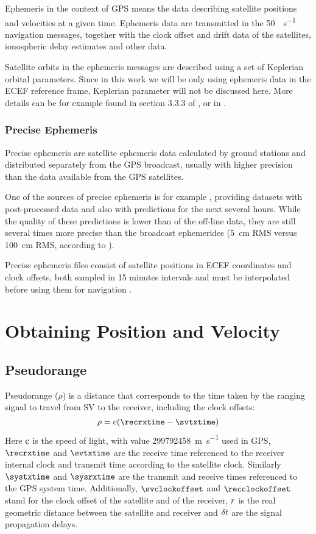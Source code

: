 Ephemeris in the context of GPS means the data describing satellite positions and velocities
at a given time.
Ephemeris data are transmitted in the \SI{50}{\bit\per\second} navigation messages,
together with the clock offset and drift data of the satellites, ionospheric
delay estimates and other data.

Satellite orbits in the ephemeris messages are described using a set of Keplerian orbital parameters.
Since in this work we will be only using ephemeris data in the ECEF reference frame, Keplerian parameter
will not be discussed here.
More details can be for example found in section 3.3.3 of \cite{rizos99}, or in \cite{kaplan06}.

\subsubsection{Precise Ephemeris}
Precise ephemeris are satellite ephemeris data calculated by ground stations
and distributed separately from the GPS broadcast, usually with higher precision
than the data available from the GPS satellites.

One of the sources of precise ephemeris is for example \cite{orbit-data}, providing datasets with
post-processed data and also with predictions for the next several hours.
While the quality of these predictions is lower than of the off-line data,
they are still several times more precise than the broadcast ephemerides
(\SI{5}{\centi\meter} RMS versus \SI{100}{\centi\meter} RMS, according to \cite{orbit-data}).

Precise ephemeris files consist of satellite positions in ECEF
coordinates and clock offsets, both sampled in 15 minutes intervals and must be interpolated
before using them for navigation \cite{schenewerk03}.

\section{Obtaining Position and Velocity}


\subsection{Pseudorange}
\label{sec:pseudorange}

Pseudorange (\(\rho\)) is a distance that corresponds to the time taken by the ranging
signal to travel from SV to the receiver, including the clock offsets:
\begin{equation}
	\label{eq:pseudorange}
	\rho = \speedoflight (\recrxtime - \svtxtime)
\end{equation}
Here \(\mathrm{c}\) is the speed of light, with value \SI{299792458}{\meter\per\second} used in GPS,
\(\recrxtime\) and \(\svtxtime\) are the receive time referenced to the receiver internal clock
and transmit time according to the satellite clock.
Similarly \(\systxtime\) and \(\sysrxtime\) are the transmit and receive times referenced
to the GPS system time.
Additionally, \(\svclockoffset\) and \(\recclockoffset\) stand for the clock offset of the satellite
and of the receiver, \(r\) is the real geometric distance between the satellite and receiver
and \(\delta{t}\) are the signal propagation delays.

